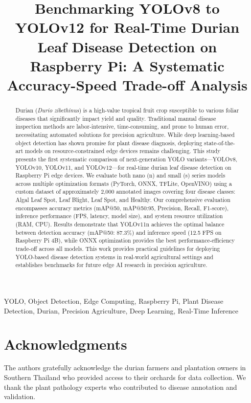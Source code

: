 \documentclass[conference]{IEEEtran}
\title{Benchmarking YOLOv8 to YOLOv12 for Real-Time Durian Leaf Disease Detection on Raspberry Pi: A Systematic Accuracy-Speed Trade-off Analysis}
\author{
\IEEEauthorblockN{Author One\textsuperscript{1}, Author Two\textsuperscript{1}, Author Three\textsuperscript{2}}
\IEEEauthorblockA{\textsuperscript{1}Department of Computer Science, University Name, City, Country\\
\textsuperscript{2}Department of Agricultural Technology, University Name, City, Country\\
Email: author@university.edu}
}
\begin{document}
\maketitle

\begin{abstract}
Durian (\textit{Durio zibethinus}) is a high-value tropical fruit crop susceptible to various foliar diseases that significantly impact yield and quality. Traditional manual disease inspection methods are labor-intensive, time-consuming, and prone to human error, necessitating automated solutions for precision agriculture. While deep learning-based object detection has shown promise for plant disease diagnosis, deploying state-of-the-art models on resource-constrained edge devices remains challenging. This study presents the first systematic comparison of next-generation YOLO variants—YOLOv8, YOLOv10, YOLOv11, and YOLOv12—for real-time durian leaf disease detection on Raspberry Pi edge devices. We evaluate both nano (n) and small (s) series models across multiple optimization formats (PyTorch, ONNX, TFLite, OpenVINO) using a custom dataset of approximately 2,000 annotated images covering four disease classes: Algal Leaf Spot, Leaf Blight, Leaf Spot, and Healthy. Our comprehensive evaluation encompasses accuracy metrics (mAP@50, mAP@50:95, Precision, Recall, F1-score), inference performance (FPS, latency, model size), and system resource utilization (RAM, CPU). Results demonstrate that YOLOv11n achieves the optimal balance between detection accuracy (mAP@50: 87.3\%) and inference speed (12.5 FPS on Raspberry Pi 4B), while ONNX optimization provides the best performance-efficiency trade-off across all models. This work provides practical guidelines for deploying YOLO-based disease detection systems in real-world agricultural settings and establishes benchmarks for future edge AI research in precision agriculture.
\end{abstract}

\begin{IEEEkeywords}
YOLO, Object Detection, Edge Computing, Raspberry Pi, Plant Disease Detection, Durian, Precision Agriculture, Deep Learning, Real-Time Inference
\end{IEEEkeywords}







\section*{Acknowledgments}
The authors gratefully acknowledge the durian farmers and plantation owners in Southern Thailand who provided access to their orchards for data collection. We thank the plant pathology experts who contributed to disease annotation and validation.



\end{document}
